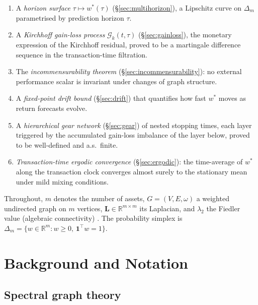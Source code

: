 \documentclass[twocolumn,11pt,a4paper]{article}
\theoremstyle{plain}
\theoremstyle{definition}
\theoremstyle{remark}
\newcommand{\R}{\mathbb{R}}
\newcommand{\Lop}{\mathbf{L}}        %
\newcommand{\wstar}{w^{*}}
\newcommand{\Deltam}{\Delta_m}
\newcommand{\lamtwo}{\lambda_2}
\newcommand{\one}{\mathbf{1}}
\newcommand{\Gain}{\mathcal{G}}
\newcommand{\GainK}{\Gain_{k}}
\begin{document}
\begin{enumerate}[label=(\roman*)]
  \item A \emph{horizon surface} $\tau\mapsto\wstar(\tau)$
        (\S\ref{sec:multihorizon}), a Lipschitz curve on $\Deltam$
        parametrised by prediction horizon $\tau$.

  \item A \emph{Kirchhoff gain-loss process} $\GainK(t,\tau)$
        (\S\ref{sec:gainloss}), the monetary expression of the
        Kirchhoff residual, proved to be a martingale difference
        sequence in the transaction-time filtration.

  \item The \emph{incommensurability theorem}
        (\S\ref{sec:incommensurability}): no external performance
        scalar is invariant under changes of graph structure.

  \item A \emph{fixed-point drift bound} (\S\ref{sec:drift}) that
        quantifies how fast $\wstar$ moves as return forecasts evolve.

  \item A \emph{hierarchical gear network} (\S\ref{sec:gear}) of nested
        stopping times, each layer triggered by the accumulated
        gain-loss imbalance of the layer below, proved to be
        well-defined and a.s.~finite.

  \item \emph{Transaction-time ergodic convergence}
        (\S\ref{sec:ergodic}): the time-average of $\wstar$ along the
        transaction clock converges almost surely to the stationary
        mean under mild mixing conditions.
\end{enumerate}

Throughout, $m$ denotes the number of assets, $G=(V,E,\omega)$ a
weighted undirected graph on $m$ vertices, $\Lop\in\R^{m\times m}$ its
Laplacian, and $\lamtwo$ the Fiedler value (algebraic connectivity)
\cite{Fiedler1973}.  The probability simplex is
$\Deltam=\{w\in\R^m:w\ge 0,\,\one^{\top}w=1\}$.

\section{Background and Notation}
\label{sec:background}

\subsection{Spectral graph theory}
\label{sec:specgraph}
\end{document}
